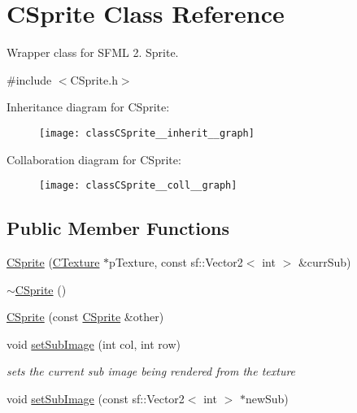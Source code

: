 \hypertarget{classCSprite}{\section{C\-Sprite Class Reference}
\label{classCSprite}
}


Wrapper class for S\-F\-M\-L 2. Sprite.  




{\ttfamily \#include $<$C\-Sprite.\-h$>$}



Inheritance diagram for C\-Sprite\-:\nopagebreak
\begin{figure}[H]
\begin{center}
\leavevmode
\texttt{[image: classCSprite\_\_inherit\_\_graph]}
\end{center}
\end{figure}


Collaboration diagram for C\-Sprite\-:\nopagebreak
\begin{figure}[H]
\begin{center}
\leavevmode
\texttt{[image: classCSprite\_\_coll\_\_graph]}
\end{center}
\end{figure}
\subsection*{Public Member Functions}
\begin{DoxyCompactItemize}
\item 
\hyperlink{classCSprite_afdfe7ac25b872dbafd60e6329185b0c5}{C\-Sprite} (\hyperlink{classCTexture}{C\-Texture} $\ast$p\-Texture, const sf\-::\-Vector2$<$ int $>$ \&curr\-Sub)
\item 
\hyperlink{classCSprite_a274146d807d98947cff67621e783d31d}{$\sim$\-C\-Sprite} ()
\item 
\hyperlink{classCSprite_a7fa10fe45cf1683163671b7483ffc758}{C\-Sprite} (const \hyperlink{classCSprite}{C\-Sprite} \&other)
\item 
void \hyperlink{classCSprite_a2162a3b87f87eecf9e9b93fe4c573690}{set\-Sub\-Image} (int col, int row)
\begin{DoxyCompactList}\small\item\em sets the current sub image being rendered from the texture \end{DoxyCompactList}\item 
void \hyperlink{classCSprite_a6e46dd766754438ebdefadf3449540da}{set\-Sub\-Image} (const sf\-::\-Vector2$<$ int $>$ $\ast$new\-Sub)
\end{DoxyCompactItemize}


